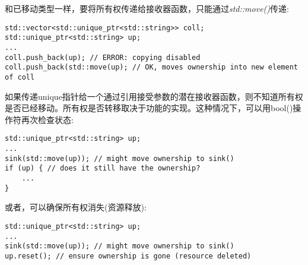 和已移动类型一样，要将所有权传递给接收器函数，只能通过\textit{std::move()}传递:\par

\begin{lstlisting}[caption={}]
std::vector<std::unique_ptr<std::string>> coll;
std::unique_ptr<std::string> up;
...
coll.push_back(up); // ERROR: copying disabled
coll.push_back(std::move(up); // OK, moves ownership into new element of coll
\end{lstlisting}

如果传递unique指针给一个通过引用接受参数的潜在接收器函数，则不知道所有权是否已经移动。所有权是否转移取决于功能的实现。这种情况下，可以用bool()操作符再次检查状态:\par

\begin{lstlisting}[caption={}]
std::unique_ptr<std::string> up;
...
sink(std::move(up)); // might move ownership to sink()
if (up) { // does it still have the ownership?
	...
}
\end{lstlisting}

或者，可以确保所有权消失(资源释放):\par

\begin{lstlisting}[caption={}]
std::unique_ptr<std::string> up;
...
sink(std::move(up)); // might move ownership to sink()
up.reset(); // ensure ownership is gone (resource deleted)
\end{lstlisting}













